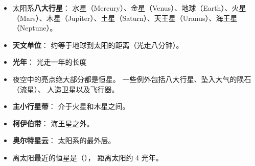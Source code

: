 
\begin{issues}
\issueDraft
\end{issues}

\begin{itemize}
\item 太阳系\textbf{八大行星}： 水星（Mercury）、金星（Venus）、地球（Earth）、火星（Mars）、木星（Jupiter）、土星（Saturn）、天王星（Uranus）、海王星（Neptune）。
\item \textbf{天文单位}： 约等于地球到太阳的距离（光走八分钟）。
\item \textbf{光年}： 光走一年的长度
\item 夜空中的亮点绝大部分都是恒星。 一些例外包括八大行星、坠入大气的陨石（流星）、 人造卫星以及飞行器。
\item \textbf{主小行星带}： 介于火星和木星之间。
\item \textbf{柯伊伯带}： 海王星之外。
\item \textbf{奥尔特星云}： 太阳系的最外层。
\item 离太阳最近的恒星是（）， 距离太阳约 4 光年。
\end{itemize}
